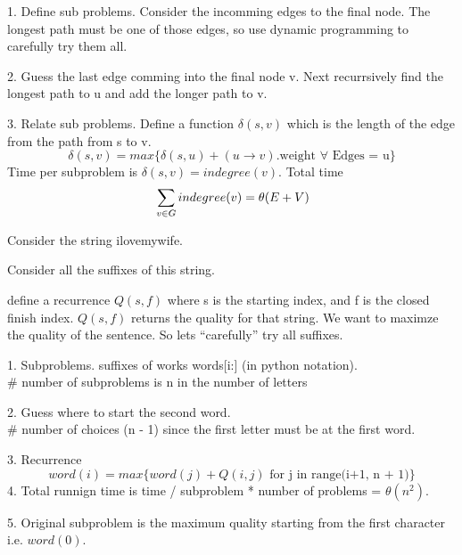 \documentclass[12pt]{article}
\newenvironment{problem}[2][Problem]{\begin{trivlist}
\item[\hskip \labelsep {\bfseries #1}\hskip \labelsep {\bfseries #2.}]}{\end{trivlist}}
\begin{document}
\begin{problem}{6.3}
    1. Define sub problems. Consider the incomming edges to the final node. The
       longest path must be one of those edges, so use dynamic programming to
       carefully try them all.
    
    2. Guess the last edge comming into the final node v. Next recurrsively
       find the longest path to u and add the longer path to v. 
    
    3. Relate sub problems. Define a function $\delta(s,v)$ which is the
       length of the edge from the path from s to v. 
       \begin{equation}
           \delta(s,v) = max\{ \delta(s, u) + (u \to v).\text{weight } \forall
               \text{ Edges = u} \}
       \end{equation}
        Time per subproblem is $\delta(s,v) = indegree(v)$. 
        Total time
        \begin{equation}
            \sideset{}{}\sum_{v \in G}indegree(v) = \theta(E + V)
        \end{equation}

\end{problem}
\begin{problem}{6.5}
    Consider the string ilovemywife.

    Consider all the suffixes of this string.

    define a recurrence $Q(s,f)$ where s is the starting index, and f is the
    closed finish index. $Q(s,f)$ returns the quality for that string. We want
    to maximze the quality of the sentence. So lets ``carefully'' try all
    suffixes.

    1. Subproblems. suffixes of works words[i:] (in python notation).\\
        \# number of subproblems is n in the number of letters

    2. Guess where to start the second word.\\
        \# number of choices (n - 1) since the first letter must be at the first
        word.

    3. Recurrence
        \begin{equation}
            word(i) = max\{ word(j) + Q(i, j) \text{ for j in range(i+1,
            n + 1)}\}
        \end{equation}
    4. Total runnign time is time / subproblem * number of problems
       = $\theta(n^2)$.

    5. Original subproblem is the maximum quality starting from the first
       character i.e. $word(0)$. 
\end{problem}
\end{document}
